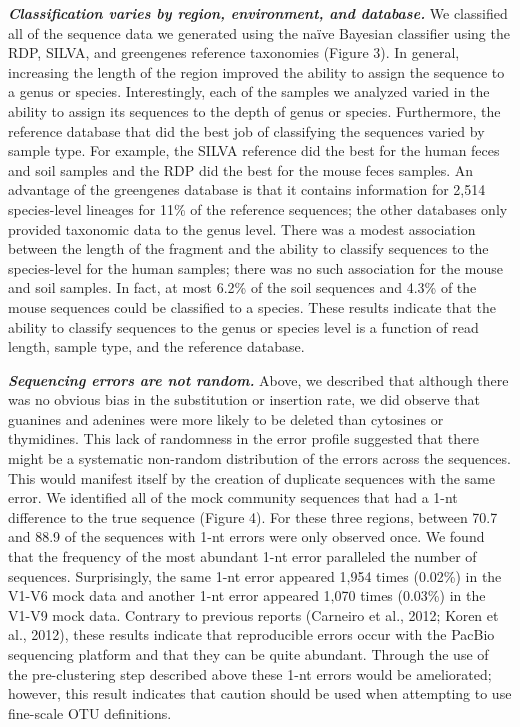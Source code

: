 \documentclass[11pt,]{article}
\begin{document}
\textbf{\emph{Classification varies by region, environment, and
database.}} We classified all of the sequence data we generated using
the naïve Bayesian classifier using the RDP, SILVA, and greengenes
reference taxonomies (Figure 3). In general, increasing the length of
the region improved the ability to assign the sequence to a genus or
species. Interestingly, each of the samples we analyzed varied in the
ability to assign its sequences to the depth of genus or species.
Furthermore, the reference database that did the best job of classifying
the sequences varied by sample type. For example, the SILVA reference
did the best for the human feces and soil samples and the RDP did the
best for the mouse feces samples. An advantage of the greengenes
database is that it contains information for 2,514 species-level
lineages for 11\% of the reference sequences; the other databases only
provided taxonomic data to the genus level. There was a modest
association between the length of the fragment and the ability to
classify sequences to the species-level for the human samples; there was
no such association for the mouse and soil samples. In fact, at most
6.2\% of the soil sequences and 4.3\% of the mouse sequences could be
classified to a species. These results indicate that the ability to
classify sequences to the genus or species level is a function of read
length, sample type, and the reference database.

\textbf{\emph{Sequencing errors are not random.}} Above, we described
that although there was no obvious bias in the substitution or insertion
rate, we did observe that guanines and adenines were more likely to be
deleted than cytosines or thymidines. This lack of randomness in the
error profile suggested that there might be a systematic non-random
distribution of the errors across the sequences. This would manifest
itself by the creation of duplicate sequences with the same error. We
identified all of the mock community sequences that had a 1-nt
difference to the true sequence (Figure 4). For these three regions,
between 70.7 and 88.9 of the sequences with 1-nt errors were only
observed once. We found that the frequency of the most abundant 1-nt
error paralleled the number of sequences. Surprisingly, the same 1-nt
error appeared 1,954 times (0.02\%) in the V1-V6 mock data and another
1-nt error appeared 1,070 times (0.03\%) in the V1-V9 mock data.
Contrary to previous reports (Carneiro et al., 2012; Koren et al.,
2012), these results indicate that reproducible errors occur with the
PacBio sequencing platform and that they can be quite abundant. Through
the use of the pre-clustering step described above these 1-nt errors
would be ameliorated; however, this result indicates that caution should
be used when attempting to use fine-scale OTU definitions.
\end{document}
